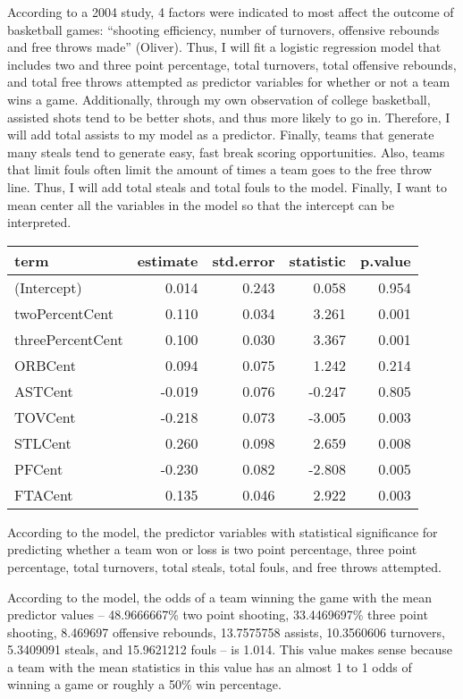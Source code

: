 \documentclass[
]{article}
\begin{document}
According to a 2004 study, 4 factors were indicated to most affect the
outcome of basketball games: ``shooting efficiency, number of turnovers,
offensive rebounds and free throws made'' (Oliver). Thus, I will fit a
logistic regression model that includes two and three point percentage,
total turnovers, total offensive rebounds, and total free throws
attempted as predictor variables for whether or not a team wins a game.
Additionally, through my own observation of college basketball, assisted
shots tend to be better shots, and thus more likely to go in. Therefore,
I will add total assists to my model as a predictor. Finally, teams that
generate many steals tend to generate easy, fast break scoring
opportunities. Also, teams that limit fouls often limit the amount of
times a team goes to the free throw line. Thus, I will add total steals
and total fouls to the model. Finally, I want to mean center all the
variables in the model so that the intercept can be interpreted.

\begin{longtable}[]{@{}lrrrr@{}}
\toprule
term & estimate & std.error & statistic & p.value \\
\midrule
\endhead
(Intercept) & 0.014 & 0.243 & 0.058 & 0.954 \\
twoPercentCent & 0.110 & 0.034 & 3.261 & 0.001 \\
threePercentCent & 0.100 & 0.030 & 3.367 & 0.001 \\
ORBCent & 0.094 & 0.075 & 1.242 & 0.214 \\
ASTCent & -0.019 & 0.076 & -0.247 & 0.805 \\
TOVCent & -0.218 & 0.073 & -3.005 & 0.003 \\
STLCent & 0.260 & 0.098 & 2.659 & 0.008 \\
PFCent & -0.230 & 0.082 & -2.808 & 0.005 \\
FTACent & 0.135 & 0.046 & 2.922 & 0.003 \\
\bottomrule
\end{longtable}

According to the model, the predictor variables with statistical
significance for predicting whether a team won or loss is two point
percentage, three point percentage, total turnovers, total steals, total
fouls, and free throws attempted.

According to the model, the odds of a team winning the game with the
mean predictor values -- 48.9666667\% two point shooting, 33.4469697\%
three point shooting, 8.469697 offensive rebounds, 13.7575758 assists,
10.3560606 turnovers, 5.3409091 steals, and 15.9621212 fouls -- is
1.014. This value makes sense because a team with the mean statistics in
this value has an almost 1 to 1 odds of winning a game or roughly a 50\%
win percentage.
\end{document}
